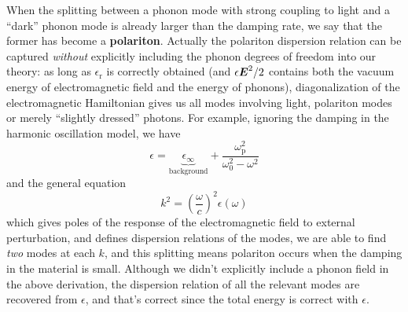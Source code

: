 \documentclass[hyperref, a4paper]{article}
\newcommand*{\concept}[1]{{\textbf{#1}}}
\newcommand{\epsr}{\epsilon_{\text{r}}}
\begin{document}
When the splitting between a phonon mode with strong coupling to light 
and a ``dark'' phonon mode 
is already larger than the damping rate, 
we say that the former has become a \concept{polariton}.
Actually the polariton dispersion relation 
can be captured \emph{without} explicitly including 
the phonon degrees of freedom into our theory:
as long as $\epsr$ is correctly obtained 
(and $\epsilon \vb*{E}^2 / 2$ contains both the vacuum energy of electromagnetic field 
and the energy of phonons), 
diagonalization of the electromagnetic Hamiltonian gives us 
all modes involving light, 
polariton modes or merely ``slightly dressed'' photons.
For example, ignoring the damping in the harmonic oscillation model, we have  
\begin{equation}
    \epsilon = \underbrace{\epsilon_{\infty}}_{\text{background}} +
    \frac{
        \omega_{\text{p}}^2
    }{
        \omega_0^2 - \omega^2
    }
\end{equation}
and the general equation 
\begin{equation}
    k^2 = \left(\frac{\omega}{c}\right)^2 \epsilon(\omega)
\end{equation}
which gives poles of the response of the electromagnetic field to external perturbation,
and defines dispersion relations of the modes,
we are able to find \emph{two} modes at each $k$,
and this splitting means polariton occurs when the damping 
in the material is small. 
Although we didn't explicitly include a phonon field in the above derivation, 
the dispersion relation of all the relevant modes are recovered from $\epsilon$,
and that's correct since the total energy is correct with $\epsilon$.
\end{document}
